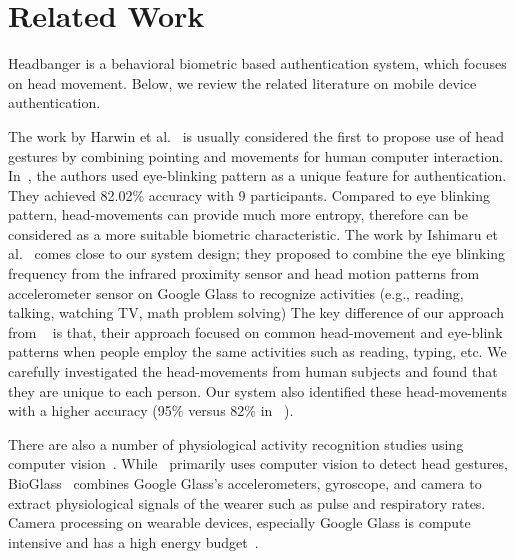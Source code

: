 \section{Related Work}\label{sec:related}
Headbanger is a behavioral biometric based
authentication system, which focuses on head movement. 
Below, we review the related literature on mobile device authentication.


The work by Harwin et al.~\cite{harwin1990analysis} is usually considered the 
first to propose use of head gestures by combining pointing and movements
for human computer interaction. 
In~\cite{westeyn2004recognizing}, the authors used 
eye-blinking pattern as a unique feature for
authentication. They achieved 82.02\% accuracy with 9 participants. Compared 
to eye blinking pattern, head-movements can provide much more entropy, 
therefore can be considered as a more suitable biometric characteristic. 
The work by Ishimaru et al.~\cite{ishimaru2014blink} comes close to our system 
design; they proposed to combine the eye blinking frequency from the infrared 
proximity sensor and head motion patterns from accelerometer sensor on Google 
Glass to recognize activities (e.g., reading, talking, watching TV,
math problem solving) 
The key difference of our approach from ~\cite{ishimaru2014blink} is 
that, their approach focused on common head-movement and eye-blink patterns 
when people employ the same activities such as reading, typing, etc. 
We carefully investigated the head-movements from human subjects and found 
that they are unique to each person. 
Our system also identified these head-movements with a higher accuracy (95$\%$ 
versus 82$\%$ in ~\cite{ishimaru2014blink}).

There are also a number of physiological activity recognition studies 
using computer vision~\cite{kjeldsen2001head,hernandezbioglass}. 
While~\cite{kjeldsen2001head} primarily uses computer vision to detect 
head gestures, BioGlass~\cite{hernandezbioglass}
combines Google Glass's accelerometers, gyroscope, and camera to
extract physiological signals of the wearer such as pulse
and respiratory rates. Camera processing on wearable devices, especially 
Google Glass is compute intensive and has a high energy 
budget~\cite{likamwa2014draining}.

